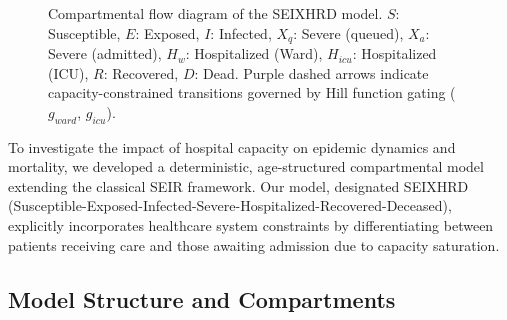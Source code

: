 \documentclass[10pt,twocolumn]{article}
\begin{document}
\begin{figure}[t]
\caption{Compartmental flow diagram of the SEIXHRD model. $S$: Susceptible, $E$: Exposed, $I$: Infected, $X_q$: Severe (queued), $X_a$: Severe (admitted), $H_w$: Hospitalized (Ward), $H_{icu}$: Hospitalized (ICU), $R$: Recovered, $D$: Dead. Purple dashed arrows indicate capacity-constrained transitions governed by Hill function gating ($g_{ward}$, $g_{icu}$).}
\label{fig:flowchart}
\end{figure}

To investigate the impact of hospital capacity on epidemic dynamics and mortality, we developed a deterministic, age-structured compartmental model extending the classical SEIR framework. 
Our model, designated SEIXHRD (Susceptible-Exposed-Infected-Severe-Hospitalized-Recovered-Deceased), explicitly incorporates healthcare system constraints by differentiating between patients receiving care and those awaiting admission due to capacity saturation.

\subsection{Model Structure and Compartments}
\end{document}

